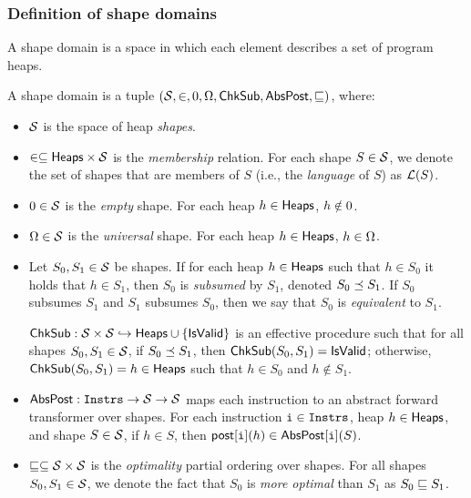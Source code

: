 \subsubsection{Definition of shape domains}
\label{sec:shapes-defn}
%
A shape domain is a space in which each element describes a set of
program heaps.
\begin{defn}
  \label{defn:shape-domain}
  A shape domain is a tuple $(\mathcal{S}, \in, 0, \Omega,
  \mathsf{ChkSub}, \mathsf{AbsPost}, \sqsubseteq)$, where:
  \begin{itemize}
  \item
    $\mathcal{S}$ is the space of heap \emph{shapes}.
  \item
    $\in \subseteq \mathsf{Heaps} \times \mathcal{S}$ is the \emph{membership}
    relation.
    For each shape $S \in \mathcal{S}$, we denote the set of shapes that
    are members of $S$ (i.e., the \emph{language} of $S$) as
    $\mathcal{L}(S)$.
  \item
    $0 \in \mathcal{S}$ is the \emph{empty} shape.
    For each heap $h \in \mathsf{Heaps}$, $h \notin 0$.
  \item
    $\Omega \in \mathcal{S}$ is the \emph{universal} shape.
    For each heap $h \in \mathsf{Heaps}$, $h \in \Omega$.
  \item
    Let $S_0, S_1 \in \mathcal{S}$ be shapes.
    If for each heap $h \in \mathsf{Heaps}$ such that $h \in S_0$ it holds
    that $h \in S_1$, then $S_0$ is \emph{subsumed} by $S_1$, denoted
    $S_0 \preceq S_1$.
    If $S_0$ subsumes $S_1$ and $S_1$ subsumes $S_0$, then we say that
    $S_0$ is \emph{equivalent} to $S_1$.

    $\mathsf{ChkSub}: \mathcal{S} \times \mathcal{S} \hookrightarrow
    \mathsf{Heaps} \cup \{ \mathsf{IsValid} \}$ is an effective procedure such that for
    all shapes $S_0, S_1 \in \mathcal{S}$, if $S_0 \preceq S_1$, then
    $\mathsf{ChkSub}(S_0, S_1) = \mathsf{IsValid}$;
    otherwise, $\mathsf{ChkSub}(S_0, S_1) = h \in \mathsf{Heaps}$ such that $h
    \in S_0$ and $h \notin S_1$.
  \item
    $\mathsf{AbsPost}: \mathtt{Instrs} \to \mathcal{S} \to \mathcal{S}$ maps each instruction
    to an abstract forward transformer over shapes.
    For each instruction $\mathtt{i} \in \mathtt{Instrs}$, heap $h \in \mathsf{Heaps}$,
    and shape $S \in \mathcal{S}$, if $h \in S$, then
    $\mathsf{post}[\mathtt{i}](h) \in \mathsf{AbsPost}[\mathtt{i}](S)$.
  \item
    $\sqsubseteq \subseteq \mathcal{S} \times \mathcal{S}$ is the
    \emph{optimality} partial ordering over shapes.
    For all shapes $S_0, S_1 \in \mathcal{S}$, we denote the fact that
    $S_0$ is \emph{more optimal} than $S_1$ as $S_0 \sqsubseteq S_1$.
  \end{itemize}
\end{defn}

